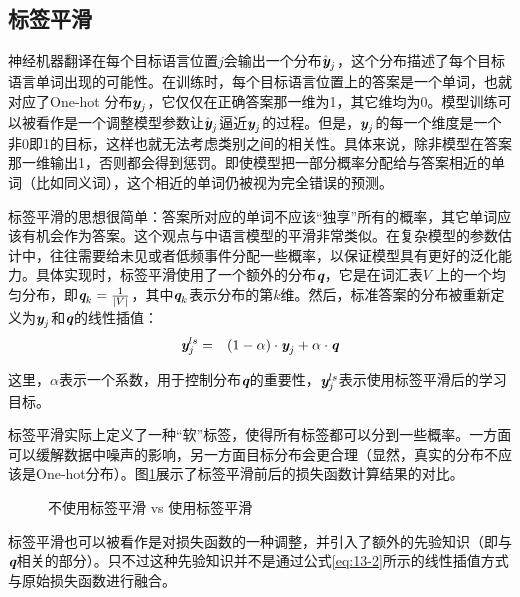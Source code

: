 \subsection{标签平滑}

\parinterval 神经机器翻译在每个目标语言位置$j$会输出一个分布$\hat{\textbf{\em y}}_j$，这个分布描述了每个目标语言单词出现的可能性。在训练时，每个目标语言位置上的答案是一个单词，也就对应了One-hot 分布${\textbf{\em y}}_j$，它仅仅在正确答案那一维为1，其它维均为0。模型训练可以被看作是一个调整模型参数让$\hat{\textbf{\em y}}_j$逼近${\textbf{\em y}}_j$的过程。但是，${\textbf{\em y}}_j$的每一个维度是一个非0即1的目标，这样也就无法考虑类别之间的相关性。具体来说，除非模型在答案那一维输出1，否则都会得到惩罚。即使模型把一部分概率分配给与答案相近的单词（比如同义词），这个相近的单词仍被视为完全错误的预测。

\parinterval 标签平滑的思想很简单：答案所对应的单词不应该“独享”所有的概率，其它单词应该有机会作为答案。这个观点与{\chaptertwo}中语言模型的平滑非常类似。在复杂模型的参数估计中，往往需要给未见或者低频事件分配一些概率，以保证模型具有更好的泛化能力。具体实现时，标签平滑使用了一个额外的分布$\textbf{\em q}$，它是在词汇表$V$ 上的一个均匀分布，即$\textbf{\em q}_k=\frac{1}{|V|}$，其中$\textbf{\em q}_k$表示分布的第$k$维。然后，标准答案的分布被重新定义为${\textbf{\em y}}_j$和$\textbf{\em q}$的线性插值：
\begin{eqnarray}
\textbf{\em y}_{j}^{ls} &=& (1-\alpha) \cdot {\textbf{\em y}}_j + \alpha \cdot \textbf{\em q}
\label{eq:13-5}
\end{eqnarray}

\noindent 这里，$\alpha$表示一个系数，用于控制分布$\textbf{\em q}$的重要性，$\textbf{\em y}_{j}^{ls}$表示使用标签平滑后的学习目标。

\parinterval 标签平滑实际上定义了一种“软”标签，使得所有标签都可以分到一些概率。一方面可以缓解数据中噪声的影响，另一方面目标分布会更合理（显然，真实的分布不应该是One-hot分布）。图\ref{fig:13-5}展示了标签平滑前后的损失函数计算结果的对比。

\begin{figure}[htp]
\centering

\caption{不使用标签平滑 vs 使用标签平滑}
\label{fig:13-5}
\end{figure}

\parinterval 标签平滑也可以被看作是对损失函数的一种调整，并引入了额外的先验知识（即与$\textbf{\em q}$相关的部分）。只不过这种先验知识并不是通过公式\eqref{eq:13-2}所示的线性插值方式与原始损失函数进行融合。

